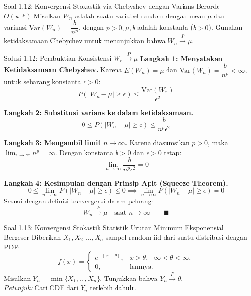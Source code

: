 \documentclass[10pt,twoside]{article}
\begin{document}
\begin{soalbox}{Soal 1.12: Konvergensi Stokastik via Chebyshev dengan Varians Berorde $O(n^{-p})$}
Misalkan $W_n$ adalah suatu variabel random dengan mean $\mu$ dan variansi $\text{Var}(W_n) = \dfrac{b}{n^p}$, dengan $p > 0, \mu, b$ adalah konstanta ($b > 0$). Gunakan ketidaksamaan Chebychev untuk menunjukkan bahwa $W_n \xrightarrow{P} \mu$.
\end{soalbox}

\begin{solbox}{Solusi 1.12: Pembuktian Konsistensi $W_n \xrightarrow{P} \mu$}
\textbf{Langkah 1: Menyatakan Ketidaksamaan Chebyshev.}
Karena $E(W_n) = \mu$ dan $\mathrm{Var}(W_n) = \dfrac{b}{n^p} < \infty$, untuk sebarang konstanta $\epsilon > 0$:
\[
P(|W_n - \mu| \ge \epsilon) \le \frac{\mathrm{Var}(W_n)}{\epsilon^2}
\]

\textbf{Langkah 2: Substitusi varians ke dalam ketidaksamaan.}
\[
0 \le P(|W_n - \mu| \ge \epsilon) \le \frac{b}{n^p \epsilon^2}
\]

\textbf{Langkah 3: Mengambil limit $n \to \infty$.}
Karena diasumsikan $p > 0$, maka $\lim_{n \to \infty} n^p = \infty$. Dengan konstanta $b > 0$ dan $\epsilon > 0$ tetap:
\[
\lim_{n \to \infty} \frac{b}{n^p \epsilon^2} = 0
\]

\textbf{Langkah 4: Kesimpulan dengan Prinsip Apit (Squeeze Theorem).}
\[
0 \le \lim_{n \to \infty} P(|W_n - \mu| \ge \epsilon) \le 0 \implies \lim_{n \to \infty} P(|W_n - \mu| \ge \epsilon) = 0
\]
Sesuai dengan definisi konvergensi dalam peluang:
\[
\boxed{W_n \xrightarrow{P} \mu \quad \text{saat } n \to \infty} \qquad \blacksquare
\]
\end{solbox}

\begin{soalbox}{Soal 1.13: Konvergensi Stokastik Statistik Urutan Minimum Eksponensial Bergeser}
Diberikan $X_1, X_2, \dots, X_n$ sampel random iid dari suatu distribusi dengan PDF:
\[
f(x) = \begin{cases} e^{-(x-\theta)}, & x > \theta, -\infty < \theta < \infty, \\ 0, & \text{lainnya.} \end{cases}
\]
Misalkan $Y_n = \min\{X_1, \dots, X_n\}$. Tunjukkan bahwa $Y_n \xrightarrow{P} \theta$.\\
\textit{Petunjuk:} Cari CDF dari $Y_n$ terlebih dahulu.
\end{soalbox}
\end{document}
